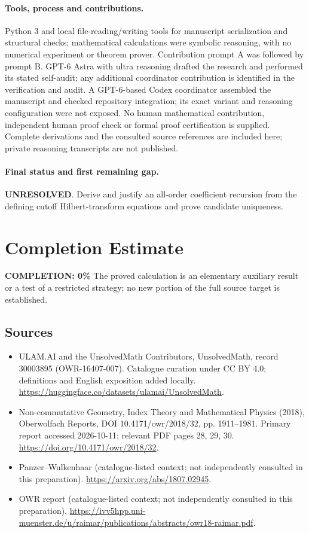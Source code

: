 \documentclass[11pt]{article}
\begin{document}
\paragraph{Tools, process and contributions.}
Python 3 and local file-reading/writing tools for manuscript serialization and structural checks; mathematical calculations were symbolic reasoning, with no numerical experiment or theorem prover. Contribution prompt A was followed by prompt B. GPT-6 Astra with ultra reasoning drafted the research and performed its stated self-audit; any additional coordinator contribution is identified in the verification and audit. A GPT-6-based Codex coordinator assembled the manuscript and checked repository integration; its exact variant and reasoning configuration were not exposed. No human mathematical contribution, independent human proof check or formal proof certification is supplied. Complete derivations and the consulted source references are included here; private reasoning transcripts are not published.

\paragraph{Final status and first remaining gap.}
\textbf{UNRESOLVED}. Derive and justify an all-order coefficient recursion from the defining cutoff Hilbert-transform equations and prove candidate uniqueness.

\section{Completion Estimate}
\noindent\textbf{COMPLETION: 0\%}
The proved calculation is an elementary auxiliary result or a test of a restricted strategy; no new portion of the full source target is established.

\subsection{Sources}
\begin{itemize}
\item[\hypertarget{source:30003895:1}{S1}] ULAM.AI and the UnsolvedMath Contributors, UnsolvedMath, record 30003895 (OWR-16407-007). Catalogue curation under CC BY 4.0; definitions and English exposition added locally.
\url{https://huggingface.co/datasets/ulamai/UnsolvedMath}.
\item[\hypertarget{source:30003895:2}{S2}] Non-commutative Geometry, Index Theory and Mathematical Physics (2018), Oberwolfach Reports, DOI 10.4171/owr/2018/32, pp. 1911--1981. Primary report accessed 2026-10-11; relevant PDF pages 28, 29, 30.
\url{https://doi.org/10.4171/owr/2018/32}.
\item[\hypertarget{source:30003895:3}{S3}] Panzer--Wulkenhaar (catalogue-listed context; not independently consulted in this preparation).
\url{https://arxiv.org/abs/1807.02945}.
\item[\hypertarget{source:30003895:4}{S4}] OWR report (catalogue-listed context; not independently consulted in this preparation).
\url{https://ivv5hpp.uni-muenster.de/u/raimar/publications/abstracts/owr18-raimar.pdf}.
\end{itemize}
\label{end:30003895}
\end{document}
